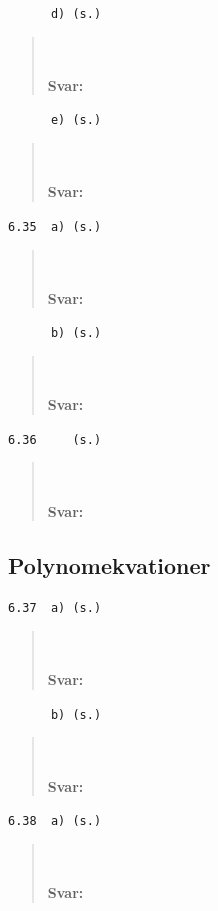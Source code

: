 \documentclass[a4paper]{article}
\newcommand{\tskcol}[1]{\textcolor{tskcol}{#1}}
\begin{document}
	\texttt{\tskcol{~~~~~~d) (s.)}}
	\begin{quotation}
		\noindent
		\\ \\
		\textbf{Svar:}
	\end{quotation}
	
	\texttt{\tskcol{~~~~~~e) (s.)}}
	\begin{quotation}
		\noindent
		\\ \\
		\textbf{Svar:}
	\end{quotation}
	
	\texttt{\tskcol{6.35~~a) (s.)}}
	\begin{quotation}
		\noindent
		\\ \\
		\textbf{Svar:}
	\end{quotation}
	
	\texttt{\tskcol{~~~~~~b) (s.)}}
	\begin{quotation}
		\noindent
		\\ \\
		\textbf{Svar:}
	\end{quotation}
	
	\texttt{\tskcol{6.36~~~~ (s.)}}
	\begin{quotation}
		\noindent
		\\ \\
		\textbf{Svar:}
	\end{quotation}
	
	\subsection*{Polynomekvationer}
	
	\texttt{\tskcol{6.37~~a) (s.)}}
	\begin{quotation}
		\noindent
		\\ \\
		\textbf{Svar:}
	\end{quotation}
	
	\texttt{\tskcol{~~~~~~b) (s.)}}
	\begin{quotation}
		\noindent
		\\ \\
		\textbf{Svar:}
	\end{quotation}
	
	\texttt{\tskcol{6.38~~a) (s.)}}
	\begin{quotation}
		\noindent
		\\ \\
		\textbf{Svar:}
	\end{quotation}
	
\end{document}
